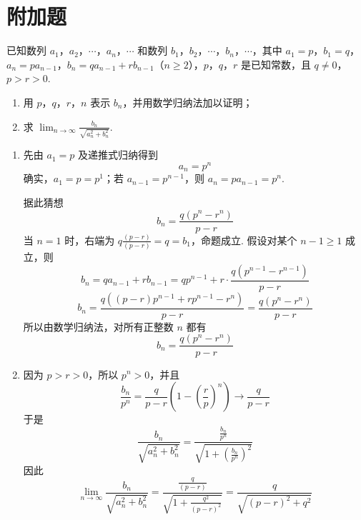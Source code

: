 \section{附加题}

\begin{problem}

已知数列 \(a_1\)，\(a_2\)，\(\cdots\)，\(a_n\)，\(\cdots\) 和数列 \(b_1\)，\(b_2\)，\(\cdots\)，\(b_n\)，\(\cdots\)，其中 \(a_1=p\)，\(b_1=q\)，\(a_n=pa_{n-1}\)，\(b_n=qa_{n-1}+rb_{n-1}\)（\(n\geqslant 2\)），\(p\)，\(q\)，\(r\) 是已知常数，且 \(q\neq 0\)，\(p>r>0\).

\begin{enumerate}
\item 用 \(p\)，\(q\)，\(r\)，\(n\) 表示 \(b_n\)，并用数学归纳法加以证明；
\item 求 \(\displaystyle\lim_{n\to\infty}\frac{b_n}{\sqrt{a_n^2+b_n^2}}\).
\end{enumerate}
\end{problem}

\begin{solution}
\begin{enumerate}
\item 先由 \(a_1=p\) 及递推式归纳得到
\[
a_n=p^n
\]
确实，\(a_1=p=p^1\)；若 \(a_{n-1}=p^{n-1}\)，则 \(a_n=pa_{n-1}=p^n\).

据此猜想
\[
b_n=\dfrac{q\left(p^n-r^n\right)}{p-r}
\]
当 \(n=1\) 时，右端为 \(q\frac{(p-r)}{(p-r)}=q=b_1\)，命题成立. 假设对某个 \(n-1\geqslant1\) 成立，则
\[
b_n=qa_{n-1}+rb_{n-1}=qp^{n-1}+r\cdot\dfrac{q\left(p^{n-1}-r^{n-1}\right)}{p-r}
\]
\[
b_n=\dfrac{q\left((p-r)p^{n-1}+rp^{n-1}-r^n\right)}{p-r}
=\dfrac{q\left(p^n-r^n\right)}{p-r}
\]
所以由数学归纳法，对所有正整数 \(n\) 都有
\[
b_n=\dfrac{q\left(p^n-r^n\right)}{p-r}
\]

\item 因为 \(p>r>0\)，所以 \(p^n>0\)，并且
\[
\dfrac{b_n}{p^n}=\dfrac{q}{p-r}\left(1-\left(\dfrac{r}{p}\right)^n\right)\longrightarrow\dfrac{q}{p-r}
\]
于是
\[
\frac{b_n}{\sqrt{a_n^2+b_n^2}}
=\frac{\frac{b_n}{p^n}}{\sqrt{1+(\frac{b_n}{p^n})^2}}
\]
因此
\[
\lim_{n\to\infty}\frac{b_n}{\sqrt{a_n^2+b_n^2}}
=\frac{\frac{q}{(p-r)}}{\sqrt{1+\frac{q^2}{(p-r)^2}}}
=\dfrac{q}{\sqrt{(p-r)^2+q^2}}
\]
\end{enumerate}
\end{solution}
